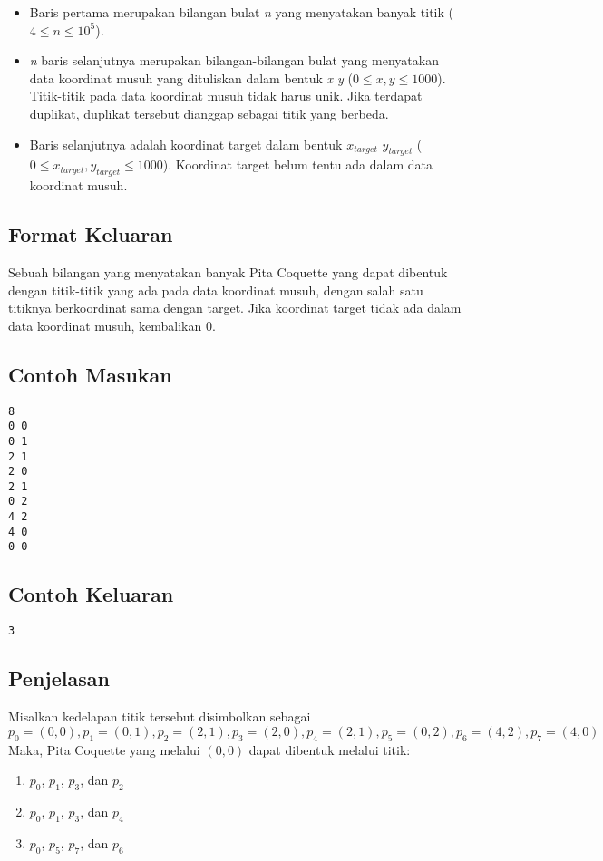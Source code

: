 \documentclass{article}
\begin{document}
\begin{itemize}
    \item Baris pertama merupakan bilangan bulat \textit{n} yang menyatakan banyak titik (\(4 \leq n \leq 10^5\)).
    \item \textit{n} baris selanjutnya merupakan bilangan-bilangan bulat yang menyatakan data koordinat musuh yang dituliskan dalam bentuk \textit{x y} (\(0 \leq x, y \leq 1000\)). Titik-titik pada data koordinat musuh tidak harus unik. Jika terdapat duplikat, duplikat tersebut dianggap sebagai titik yang berbeda.
    \item Baris selanjutnya adalah koordinat target dalam bentuk \(x_{target}\) \(y_{target}\) (\(0 \leq x_{target}, y_{target} \leq 1000\)). Koordinat target belum tentu ada dalam data koordinat musuh.
\end{itemize}

\subsection*{Format Keluaran}

Sebuah bilangan yang menyatakan banyak Pita Coquette yang dapat dibentuk dengan titik-titik yang ada pada data koordinat musuh, dengan salah satu titiknya berkoordinat sama dengan target. Jika koordinat target tidak ada dalam data koordinat musuh, kembalikan 0.

\begin{multicols}{2}
\subsection*{Contoh Masukan}
\begin{lstlisting}
8
0 0
0 1
2 1
2 0
2 1
0 2
4 2
4 0
0 0
\end{lstlisting}
\columnbreak
\subsection*{Contoh Keluaran}
\begin{lstlisting}
3
\end{lstlisting}
\vfill
\null
\end{multicols}


\subsection*{Penjelasan}

Misalkan kedelapan titik tersebut disimbolkan sebagai 
\(p_0=(0,0), p_1=(0,1), p_2=(2,1), p_3=(2,0), p_4=(2,1), p_5=(0,2), p_6=(4,2), p_7=(4,0)\)
Maka, Pita Coquette yang melalui \((0,0)\) dapat dibentuk melalui titik:
\begin{enumerate}
    \item \(p_0\), \(p_1\), \(p_3\), dan \(p_2\)
    \item \(p_0\), \(p_1\), \(p_3\), dan \(p_4\)
    \item \(p_0\), \(p_5\), \(p_7\), dan \(p_6\)
\end{enumerate}
\end{document}

